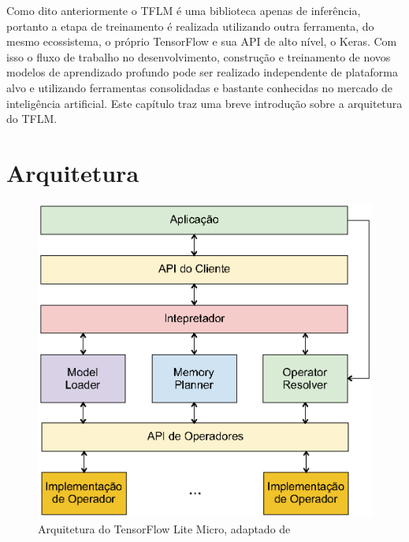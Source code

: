 \documentclass[a5paper]{ufsc-thesis}  %
\begin{document}
Como dito anteriormente o TFLM é uma biblioteca apenas de inferência, portanto a etapa de treinamento é realizada utilizando outra ferramenta, do mesmo ecossistema, o próprio TensorFlow e sua API de alto nível, o Keras. Com isso o fluxo de trabalho no desenvolvimento, construção e treinamento de novos modelos de aprendizado profundo pode ser realizado independente de plataforma alvo e utilizando ferramentas consolidadas e bastante conhecidas no mercado de inteligência artificial. Este capítulo traz uma breve introdução sobre a arquitetura do TFLM.

\section{Arquitetura}

\begin{figure}[!ht]
    \centering
    \includegraphics[width=0.8\linewidth]{imagens/tflm_arch.eps}
    \caption{Arquitetura do TensorFlow Lite Micro, adaptado de \cite{tflu}}
    \label{fig:tflm_arch}
\end{figure}
\end{document}

